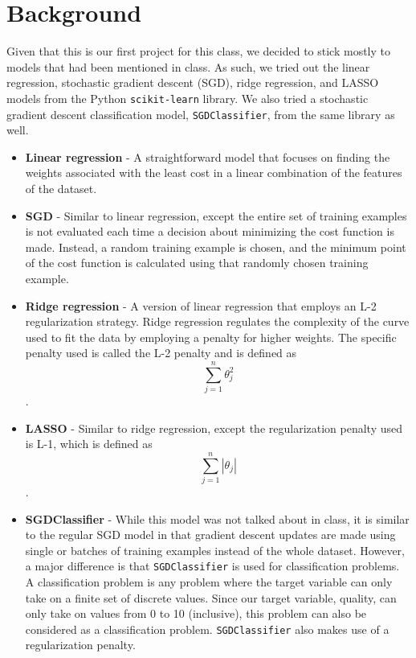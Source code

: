 
\section{Background}
\label{sec:background}
Given that this is our first project for this class, we decided to stick mostly to models that had been mentioned in class. As such, we tried out the linear regression, stochastic gradient descent (SGD), ridge regression, and LASSO models from the Python \texttt{scikit-learn} library. We also tried a stochastic gradient descent classification model, \texttt{SGDClassifier}, from the same library as well.
\begin{itemize}
    \item \textbf{Linear regression} - A straightforward model that focuses on finding the weights associated with the least cost in a linear combination of the features of the dataset. 
    \item \textbf{SGD} - Similar to linear regression, except the entire set of training examples is not evaluated each time a decision about minimizing the cost function is made. Instead, a random training example is chosen, and the minimum point of the cost function is calculated using that randomly chosen training example.
    \item \textbf{Ridge regression} - A version of linear regression that employs an L-2 regularization strategy. Ridge regression regulates the complexity of the curve used to fit the data by employing a penalty for higher weights. The specific penalty used is called the L-2 penalty and is defined as $$\sum_{j=1}^{n} \theta_{j}^{2}$$.
    \item \textbf{LASSO} - Similar to ridge regression, except the regularization penalty used is L-1, which is defined as $$\sum_{j=1}^{n} |\theta_{j}|$$.
    \item \textbf{SGDClassifier} - While this model was not talked about in class, it is similar to the regular SGD model in that gradient descent updates are made using single or batches of training examples instead of the whole dataset. However, a major difference is that \texttt{SGDClassifier} is used for classification problems. A classification problem is any problem where the target variable can only take on a finite set of discrete values. Since our target variable, quality, can only take on values from 0 to 10 (inclusive), this problem can also be considered as a classification problem. \texttt{SGDClassifier} also makes use of a regularization penalty.
\end{itemize}
